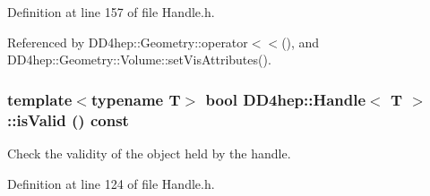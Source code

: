 Definition at line 157 of file Handle.h.

Referenced by DD4hep::Geometry::operator$<$$<$(), and DD4hep::Geometry::Volume::setVisAttributes().\hypertarget{class_d_d4hep_1_1_handle_a4c5293aecb11989a708ec7615d0f0842}{
\subsubsection[{isValid}]{\setlength{\rightskip}{0pt plus 5cm}template$<$typename T$>$ bool {\bf DD4hep::Handle}$<$ {\bf T} $>$::isValid () const}}
\label{class_d_d4hep_1_1_handle_a4c5293aecb11989a708ec7615d0f0842}


Check the validity of the object held by the handle. 

Definition at line 124 of file Handle.h.

